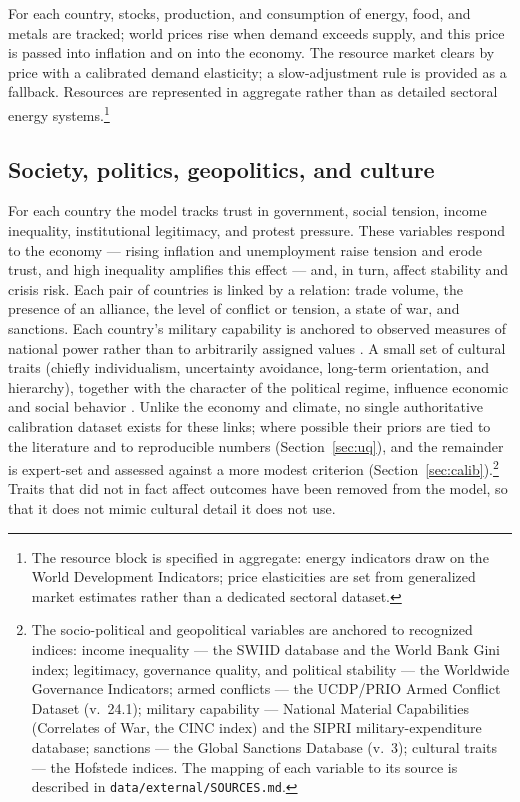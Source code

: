 \documentclass[11pt,a4paper]{article}
\begin{document}
For each country, stocks, production, and consumption of energy, food, and metals are tracked; world
prices rise when demand exceeds supply, and this price is passed into inflation and on into the
economy. The resource market clears by price with a calibrated demand elasticity; a slow-adjustment
rule is provided as a fallback. Resources are represented in aggregate rather than as detailed
sectoral energy systems.\footnote{The resource block is specified in aggregate: energy indicators
draw on the World Development Indicators; price elasticities are set from generalized market
estimates rather than a dedicated sectoral dataset.}

\subsection{Society, politics, geopolitics, and culture}

For each country the model tracks trust in government, social tension, income inequality,
institutional legitimacy, and protest pressure. These variables respond to the economy --- rising
inflation and unemployment raise tension and erode trust, and high inequality amplifies this effect
--- and, in turn, affect stability and crisis risk. Each pair of countries is linked by a relation:
trade volume, the presence of an alliance, the level of conflict or tension, a state of war, and
sanctions. Each country's military capability is anchored to observed measures of national power
rather than to arbitrarily assigned values \citep{singer1972}. A small set of cultural traits
(chiefly individualism, uncertainty avoidance, long-term orientation, and hierarchy), together with
the character of the political regime, influence economic and social behavior \citep{hofstede2010}.
Unlike the economy and climate, no single authoritative calibration dataset exists for these links;
where possible their priors are tied to the literature and to reproducible numbers
(Section~\ref{sec:uq}), and the remainder is expert-set and assessed against a more modest
criterion (Section~\ref{sec:calib}).\footnote{The socio-political and geopolitical variables are
anchored to recognized indices: income inequality --- the SWIID database and the World Bank Gini
index; legitimacy, governance quality, and political stability --- the Worldwide Governance
Indicators; armed conflicts --- the UCDP/PRIO Armed Conflict Dataset (v.~24.1); military capability
--- National Material Capabilities (Correlates of War, the CINC index) and the SIPRI
military-expenditure database; sanctions --- the Global Sanctions Database (v.~3); cultural traits
--- the Hofstede indices. The mapping of each variable to its source is described in
\texttt{data/external/SOURCES.md}.} Traits that did not in fact affect outcomes have been removed
from the model, so that it does not mimic cultural detail it does not use.
\end{document}
